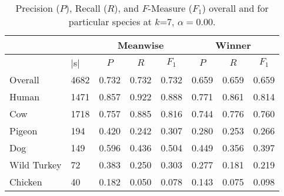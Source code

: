 \begin{table}[t]
\centering
\caption{Precision ($P$), Recall ($R$), and $F$-Measure ($F_1$) overall and for particular species at $k$=7, $\alpha=0.00$.}
\begin{tabular}{llllllll}
\cline{3-8}
                                  & \multicolumn{1}{l|}{}             & \multicolumn{3}{c|}{Meanwise}                                                  & \multicolumn{3}{c|}{Winner}                                                    \\ \hline
\multicolumn{1}{|l|}{\Spec{}} & \multicolumn{1}{l|}{$|$\Isol{}s$|$} & \multicolumn{1}{c}{$P$} & \multicolumn{1}{c}{$R$} & \multicolumn{1}{c|}{$F_1$} & \multicolumn{1}{c}{$P$} & \multicolumn{1}{c}{$R$} & \multicolumn{1}{c|}{$F_1$} \\ \hline
\multicolumn{1}{|l|}{Overall}     & \multicolumn{1}{l|}{4682}         & 0.732                   & 0.732                   & \multicolumn{1}{l|}{0.732} & 0.659                   & 0.659                   & \multicolumn{1}{l|}{0.659} \\
\multicolumn{1}{|l|}{Human}       & \multicolumn{1}{l|}{1471}         & 0.857                   & 0.922                   & \multicolumn{1}{l|}{0.888} & 0.771                   & 0.861                   & \multicolumn{1}{l|}{0.814} \\
\multicolumn{1}{|l|}{Cow}         & \multicolumn{1}{l|}{1718}         & 0.757                   & 0.885                   & \multicolumn{1}{l|}{0.816} & 0.744                   & 0.776                   & \multicolumn{1}{l|}{0.760} \\
\multicolumn{1}{|l|}{Pigeon}      & \multicolumn{1}{l|}{194}          & 0.420                   & 0.242                   & \multicolumn{1}{l|}{0.307} & 0.280                   & 0.253                   & \multicolumn{1}{l|}{0.266} \\
\multicolumn{1}{|l|}{Dog}         & \multicolumn{1}{l|}{149}          & 0.596                   & 0.436                   & \multicolumn{1}{l|}{0.504} & 0.449                   & 0.356                   & \multicolumn{1}{l|}{0.397} \\
\multicolumn{1}{|l|}{Wild Turkey} & \multicolumn{1}{l|}{72}           & 0.383                   & 0.250                   & \multicolumn{1}{l|}{0.303} & 0.277                   & 0.181                   & \multicolumn{1}{l|}{0.219} \\
\multicolumn{1}{|l|}{Chicken}     & \multicolumn{1}{l|}{40}           & 0.182                   & 0.050                   & \multicolumn{1}{l|}{0.078} & 0.143                   & 0.075                   & \multicolumn{1}{l|}{0.098} \\

\end{tabular}
\end{table}
